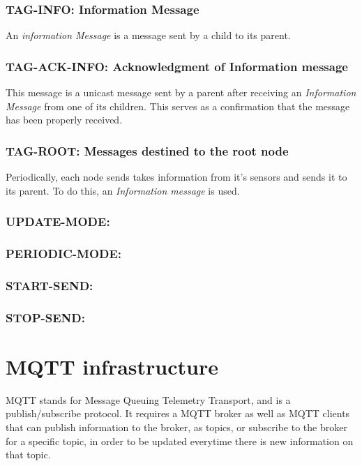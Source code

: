 \documentclass[a4paper,11pt]{article}
\begin{document}
\subsubsection{TAG-INFO: Information Message}
An \textit{information Message} is a message sent by a child to its parent.

\subsubsection{TAG-ACK-INFO: Acknowledgment of Information message}
This message is a unicast message sent by a parent after receiving an \textit{Information Message} from one of its children. This serves as a confirmation that the message has been properly received.


\subsubsection{TAG-ROOT: Messages destined to the root node}
Periodically, each node sends takes information from it's sensors and sends it to its parent. To do this, an \textit{Information message} is used.


\subsubsection{UPDATE-MODE: }
\subsubsection{PERIODIC-MODE: }
\subsubsection{START-SEND:}
\subsubsection{STOP-SEND:}





\section{MQTT infrastructure}
MQTT stands for Message Queuing Telemetry Transport, and is a publish/subscribe protocol. It requires a MQTT broker as well as MQTT clients that can publish information to the broker, as topics, or subscribe to the broker for a specific topic, in order to be updated everytime there is new information on that topic.
\end{document}
